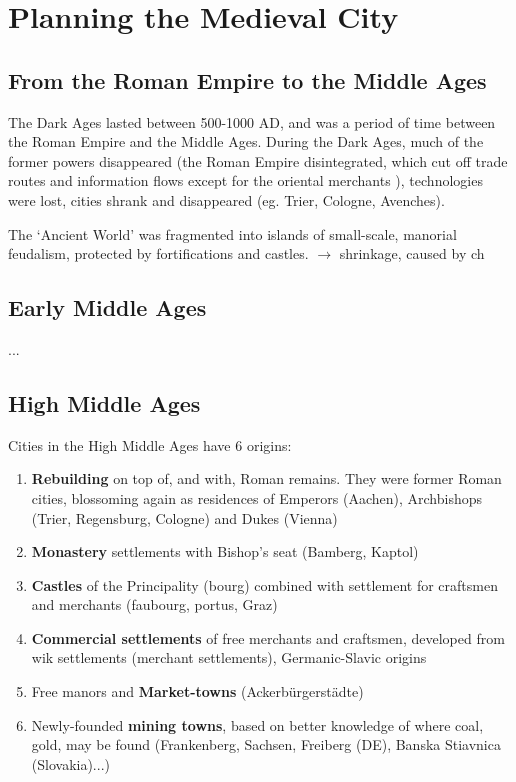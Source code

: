 \documentclass{article}
\newcommand{\alignedmarginpar}[1]{%
        \marginpar{\raggedright\small #1}
    }
\begin{document}
\section{Planning the Medieval City}

\subsection{From the Roman Empire to the Middle Ages}

The Dark Ages lasted between 500-1000 AD, and was a period of time between the Roman Empire and the Middle Ages. During the Dark Ages, much of the former powers disappeared (the Roman Empire disintegrated, which cut off trade routes and information flows except for the oriental merchants\alignedmarginpar{Orient = non-Latin speaking}), technologies were lost, cities shrank and disappeared (eg. Trier, Cologne, Avenches). 

The `Ancient World' was fragmented into islands of small-scale, manorial feudalism, protected by fortifications and castles. $\rightarrow$ shrinkage, caused by ch

\subsection{Early Middle Ages}

...

\subsection{High Middle Ages}

Cities in the High Middle Ages have 6 origins:

\begin{enumerate}
	\item \textbf{Rebuilding} on top of, and with, Roman remains. They were former Roman cities, blossoming again as residences of Emperors (Aachen), Archbishops (Trier, Regensburg, Cologne) and Dukes (Vienna)
	\item \textbf{Monastery} settlements with Bishop's seat (Bamberg, Kaptol)
	\item \textbf{Castles} of the Principality (bourg) combined with settlement for craftsmen and merchants (faubourg, portus, Graz)
	\item \textbf{Commercial settlements} of free merchants and craftsmen, developed from wik settlements (merchant settlements), Germanic-Slavic origins
	\item Free manors and \textbf{Market-towns} (Ackerbürgerstädte)
	\item Newly-founded \textbf{mining towns}, based on better knowledge of where coal, gold, may be found (Frankenberg, Sachsen, Freiberg (DE), Banska Stiavnica (Slovakia)...)
\end{enumerate}
\end{document}
